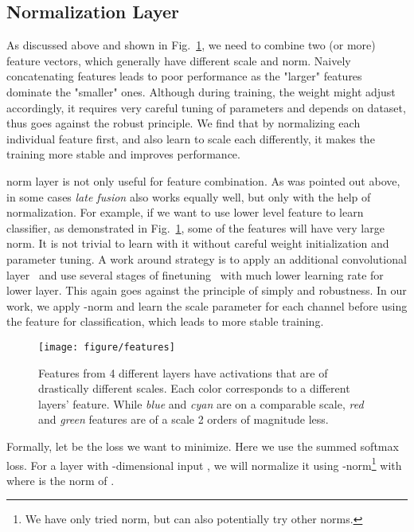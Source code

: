 \documentclass{article} \usepackage{iclr2016_conference}
\begin{document}
\subsection{ Normalization Layer}
\label{sec:l2norm}
As discussed above and shown in Fig.~\ref{fig:differentscale}, we need to combine two (or more) feature vectors, which generally have different scale and norm. Naively concatenating features leads to poor performance as the "larger" features dominate the "smaller" ones. Although during training, the weight might adjust accordingly, it requires very careful tuning of parameters and depends on dataset, thus goes against the robust principle. We find that by normalizing each individual feature first, and also learn to scale each differently, it makes the training more stable and improves performance.

 norm layer is not only useful for feature combination. As was pointed out above, in some cases \emph{late fusion} also works equally well, but only with the help of  normalization. For example, if we want to use lower level feature to learn classifier, as demonstrated in Fig.~\ref{fig:differentscale}, some of the features will have very large norm. It is not trivial to learn with it without careful weight initialization and parameter tuning. A work around strategy is to apply an additional convolutional layer~\cite{chen2014semantic, hariharan2014hypercolumns} and use several stages of finetuning~\cite{long2014fully} with much lower learning rate for lower layer. This again goes against the principle of simply and robustness. In our work, we apply -norm and learn the scale parameter for each channel before using the feature for classification, which leads to more stable training.
\begin{figure}
	\centering
	\texttt{[image: figure/features]}
	\caption{Features from 4 different layers have activations that are of drastically different scales. Each color corresponds to a different layers' feature. While \emph{\textcolor[rgb]{0,0,1}{blue}} and \emph{\textcolor[rgb]{0,1,1}{cyan}} are on a comparable scale, \emph{\textcolor[rgb]{1,0,0}{red}} and \emph{\textcolor[rgb]{0,1,0}{green}} features are of a scale 2 orders of magnitude less.}
	\label{fig:differentscale}
\end{figure}

Formally, let  be the loss we want to minimize. Here we use the summed softmax loss. For a layer with -dimensional input , we will normalize it using -norm\footnote{We have only tried  norm, but can also potentially try other  norms.} with  where  is the  norm of .
\end{document}
